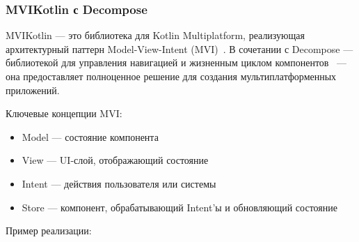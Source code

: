 \documentclass[14pt, russian]{scrartcl}
\begin{document}
\subsubsection{MVIKotlin с Decompose}

MVIKotlin — это библиотека для Kotlin Multiplatform, реализующая архитектурный паттерн Model-View-Intent (MVI)~\cite{mvikotlin}. В сочетании с Decompose — библиотекой для управления навигацией и жизненным циклом компонентов~\cite{decompose} — она предоставляет полноценное решение для создания мультиплатформенных приложений.

Ключевые концепции MVI:
\begin{itemize}
    \item Model — состояние компонента
    \item View — UI-слой, отображающий состояние
    \item Intent — действия пользователя или системы
    \item Store — компонент, обрабатывающий Intent'ы и обновляющий состояние
\end{itemize}

Пример реализации:
\end{document}
